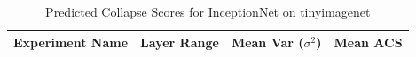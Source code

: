 \begin{table}[h]
\centering
\caption{Predicted Collapse Scores for InceptionNet on tinyimagenet}
\label{tab:acs_inceptionnet}
\begin{tabular}{@{}llcc@{}}
\toprule
\textbf{Experiment Name} & \textbf{Layer Range} & \textbf{Mean Var ($\sigma^2$)} & \textbf{Mean ACS} \\ \midrule
\bottomrule
\end{tabular}
\end{table}